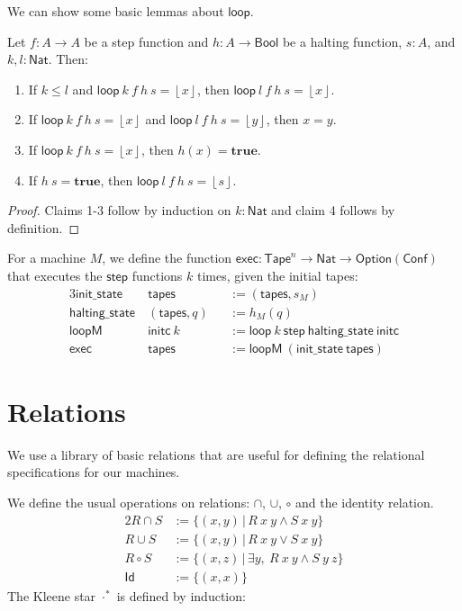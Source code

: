 \documentclass{psartcl}
\newcommand{\MS}[1]{\textsf{#1}}
\newcommand{\setOf}[1]{\bigl \{ #1 \bigr \}}
\newcommand{\setMap}[2]{\setOf{#1 \,\big|\, #2}}
\newcommand{\from}{:}
\renewcommand{\to}{\rightarrow}
\newcommand{\Option}{\MS{Option}}
\newcommand{\Bool}{\MS{Bool}}
\newcommand{\Nat}{\MS{Nat}}
\newcommand{\Some}[1]{\left\lfloor #1\right\rfloor}
\newcommand{\true}{\mathbf{true}}
\newcommand{\Tape}{\MS{Tape}}
\newcommand{\Tapes}[1]{\Tape^{#1}}
\begin{document}
We can show some basic lemmas about $\MS{loop}$.
\begin{lemma}[Simple facts about $\MS{loop}$]
  \label{lem:loop}
  Let $f \from A \to A$ be a step function and $h \from A \to \Bool$ be a halting function, $s:A$, and $k, l:\Nat$.  Then:
  \begin{enumerate}
    \item If $k \le l$ and $\MS{loop}~k~f~h~s = \Some x$, then $\MS{loop}~l~f~h~s = \Some x$.
    \item If $\MS{loop}~k~f~h~s = \Some x$ and $\MS{loop}~l~f~h~s = \Some y$, then $x = y$.
    \item If $\MS{loop}~k~f~h~s = \Some{x}$, then $h(x) = \true$.
    \item If $h~s = \true$, then $\MS{loop}~l~f~h~s = \Some{s}$.
  \end{enumerate}
\end{lemma}
\begin{proof}
  Claims 1-3 follow by induction on $k:\Nat$ and claim 4 follows by definition.
\end{proof}

For a machine $M$, we define the function $\MS{exec} \from \Tapes{n} \to \Nat \to \Option(\MS{Conf})$ that executes the $\MS{step}$ functions $k$ times,
given the initial tapes:
\begin{alignat*}{3}
  \MS{init\_state}   &~\MS{tapes}      &&:= (\MS{tapes}, s_M) \\
  \MS{halting\_state}&~(\MS{tapes}, q) &&:= h_M(q) \\
  \MS{loopM}         &~\MS{initc}~k    &&:= \MS{loop}~k~\MS{step}~\MS{halting\_state}~\MS{initc} \\
  \MS{exec}          &~\MS{tapes}      &&:= \MS{loopM}~(\MS{init\_state}~\MS{tapes})
\end{alignat*}


\section{Relations}

We use a library of basic relations that are useful for defining the relational specifications for our machines.

We define the usual operations on relations: $\cap$, $\cup$, $\circ$ and the identity relation.
\begin{alignat*}{2}
  R \cap  S &:= \setMap{(x, y)}{R~x~y \land S~x~y} \\
  R \cup  S &:= \setMap{(x, y)}{R~x~y \lor  S~x~y} \\
  R \circ S &:= \setMap{(x, z)}{\exists y,~ R~x~y \land S~y~z} \\
  \MS{Id}   &:= \setOf{(x, x)}{}
\end{alignat*}
The Kleene star ${\cdot}^*$ is defined by induction:
\end{document}
